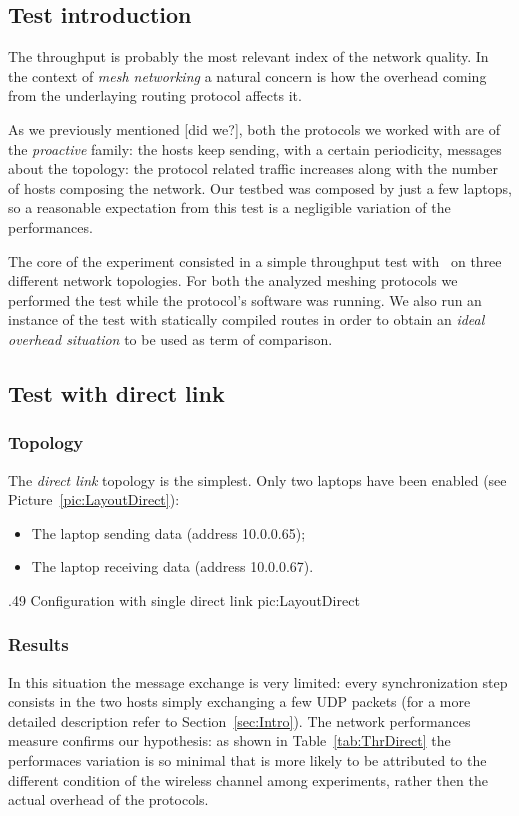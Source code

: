 \subsection{Test introduction}

    The throughput is probably the most relevant index of the network
    quality. In the context of \emph{mesh networking} a natural concern
    is how the overhead coming from the underlaying routing protocol
    affects it.

    As we previously mentioned [did we?], both the protocols we worked
    with are of the \emph{proactive} family: the hosts keep sending,
    with a certain periodicity, messages about the topology: the protocol
    related traffic increases along with the number of hosts composing the
    network.  Our testbed was composed by just a few laptops, so a
    reasonable expectation from this test is a negligible variation of the
    performances.

    The core of the experiment consisted in a simple throughput test with
    \netperf\ on three different network topologies. For both the
    analyzed meshing protocols we performed the test while the protocol's
    software was running. We also run an instance of the test with
    statically compiled routes in order to obtain an \emph{ideal overhead
    situation} to be used as term of comparison.

\subsection{Test with direct link}

\subsubsection{Topology}
        The \emph{direct link} topology is the simplest. Only two laptops
        have been enabled (see Picture~\ref{pic:LayoutDirect}):
        \begin{itemize}
        \item   The laptop sending data (address 10.0.0.65);
        \item   The laptop receiving data (address 10.0.0.67).
        \end{itemize}
        
                {.49\columnwidth}
                {Configuration with single direct link}
                {pic:LayoutDirect}

\subsubsection{Results}
        In this situation the message exchange is very limited: every
        synchronization step consists in the two hosts simply exchanging a few
        UDP packets (for a more detailed description refer to
        Section~\ref{sec:Intro}). The network performances measure confirms our
        hypothesis: as shown in Table~\ref{tab:ThrDirect} the performaces
        variation is so minimal that is more likely to be attributed to the
        different condition of the wireless channel among experiments, rather
        then the actual overhead of the protocols.

